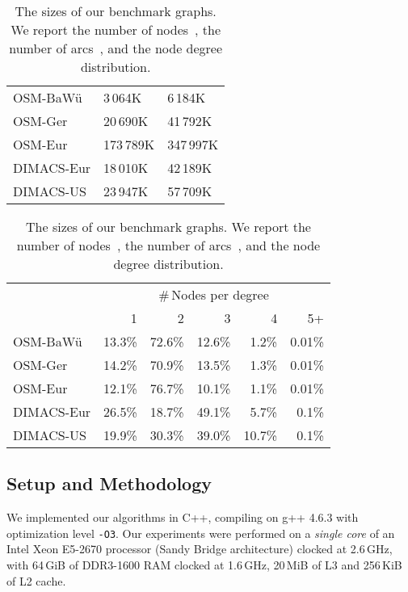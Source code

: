 \documentclass{sig-alternate}
\begin{document}
\begin{table}[b]
\caption{\label{tab:size}The sizes of our benchmark graphs. We report the number of nodes~, the number of arcs~, and the node degree distribution.}

\begin{tabular}{m{}m{}m{}}
\toprule
&  &  \tabularnewline
\midrule
OSM-BaWü & 3\,064K & 6\,184K \tabularnewline
OSM-Ger & 20\,690K & 41\,792K \tabularnewline
OSM-Eur & 173\,789K & 347\,997K \tabularnewline
DIMACS-Eur & 18\,010K & 42\,189K \tabularnewline
DIMACS-US & 23\,947K & 57\,709K \tabularnewline
\end{tabular}

\begin{tabular}{lrrrrr}
\toprule
 & \multicolumn{5}{c}{\#\,Nodes per degree}\tabularnewline
 & 1 & 2 & 3 & 4 & 5+\tabularnewline
\midrule
OSM-BaWü & 13.3\% & 72.6\% & 12.6\% & 1.2\% & 0.01\%\tabularnewline
OSM-Ger & 14.2\% & 70.9\% & 13.5\% & 1.3\% & 0.01\%\tabularnewline
OSM-Eur & 12.1\% & 76.7\% & 10.1\% & 1.1\% & 0.01\%\tabularnewline
DIMACS-Eur & 26.5\% & 18.7\% & 49.1\% & 5.7\% & 0.1\%\tabularnewline
DIMACS-US & 19.9\% & 30.3\% & 39.0\% & 10.7\% & 0.1\%\tabularnewline
\bottomrule
\end{tabular}

\end{table}

\subsection{Setup and Methodology}
We implemented our algorithms in C++, compiling on g++ 4.6.3 with optimization level \texttt{-O3}.
Our experiments were performed on a \emph{single core} of an Intel Xeon E5-2670 processor (Sandy Bridge architecture) clocked at 2.6\,GHz, with 64\,GiB of DDR3-1600 RAM clocked at 1.6\,GHz, 20\,MiB of L3 and 256\,KiB of L2 cache.
\end{document}
